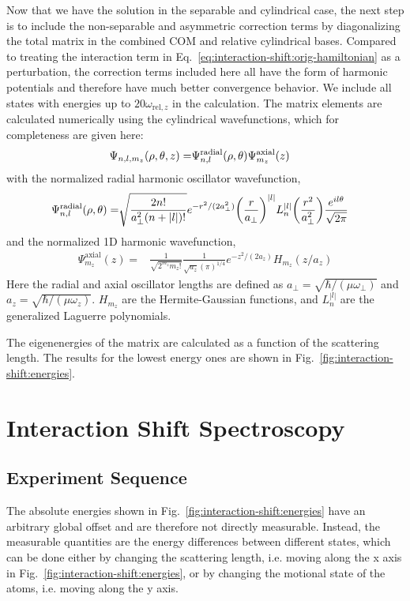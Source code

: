 Now that we have the solution in the separable and cylindrical case,
the next step is to include the non-separable and asymmetric correction terms
by diagonalizing the total matrix in the combined COM and relative cylindrical bases.
Compared to treating the interaction term in Eq.~\ref{eq:interaction-shift:orig-hamiltonian}
as a perturbation, the correction terms included here all have the form of
harmonic potentials and therefore have much better convergence behavior.
We include all states with energies up to $20 \omega_{\mathrm{rel},z}$ in the calculation.
The matrix elements are calculated numerically using the cylindrical wavefunctions,
which for completeness are given here:
\begin{align*}
  \Psi_{n,l,m_z}{\left({\rho,\theta,z}\right)}=
  &\Psi^{\mathrm{radial}}_{n,l}{\left({\rho, \theta}\right)}\Psi^{\mathrm{axial}}_{m_z}{\left({z}\right)}
\end{align*}
with the normalized radial harmonic oscillator wavefunction,
\begin{align*}
  \Psi^{\mathrm{radial}}_{n,l}{\left({\rho, \theta}\right)}=
  &\sqrt{\frac{2n!}{a_\perp^2 (n+|l|)!}} e^{-r^2/(2 a_\perp^2)} {\left({\frac{r}{a_\perp}}\right)}^{|l|}
    L_n^{|l|}{\left({\frac{r^2}{a_\perp^2}}\right)} \frac{ e^{i l \theta}}{\sqrt{2 \pi}}
\end{align*}
and the normalized 1D harmonic wavefunction,
\begin{align*}
  \Psi^{\mathrm{axial}}_{m_z}(z)=&\frac{1}{\sqrt{2^{m_z} m_z!}} \frac{1}{\sqrt{a_z}(\pi)^{1/4}}
                                   e^{-z^2/(2 a_z)} H_{m_z}(z/a_z)
\end{align*}
Here the radial and axial oscillator lengths are defined as
$a_\perp = \sqrt{\hbar/(\mu \omega_\perp)}$ and $a_z = \sqrt{\hbar/ (\mu \omega_z)}$.
$H_{m_z}$ are the Hermite-Gaussian functions,
and $L^{|l|}_n$ are the generalized Laguerre polynomials.

The eigenenergies of the matrix are calculated as a function of the scattering length.
The results for the lowest energy ones are shown in Fig.~\ref{fig:interaction-shift:energies}.

\section{Interaction Shift Spectroscopy}
\label{ch:interaction-shift:spectroscopy}

\subsection{Experiment Sequence}
\label{ch:interaction-shift:spectroscopy:sequence}
The absolute energies shown in Fig.~\ref{fig:interaction-shift:energies} have an arbitrary global
offset and are therefore not directly measurable.
Instead, the measurable quantities are the energy differences between different states,
which can be done either by changing the scattering length,
i.e. moving along the x axis in Fig.~\ref{fig:interaction-shift:energies},
or by changing the motional state of the atoms, i.e. moving along the y axis.

